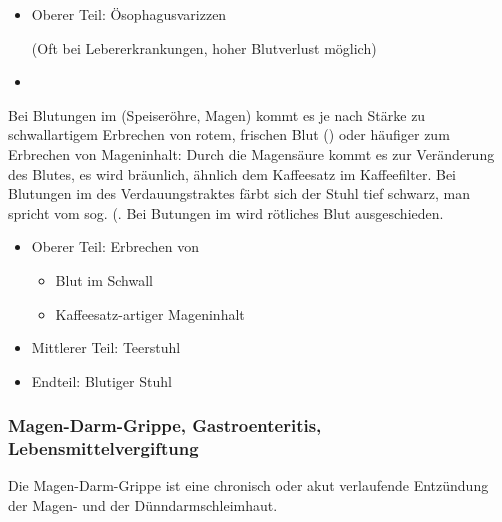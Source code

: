 {{}
{
\begin{itemize}
    \item Oberer Teil: Ösophagusvarizzen
    
    (Oft bei
    Lebererkrankungen, hoher Blutverlust möglich)
    \item {}
\end{itemize}
}{}{}{}

{
Bei Blutungen im 
(Speiseröhre, Magen) kommt es je nach Stärke zu
schwallartigem Erbrechen  von rotem, frischen Blut
() oder häufiger zum Erbrechen von
Mageninhalt: Durch die Magensäure kommt es zur Veränderung
des Blutes, es wird bräunlich, ähnlich dem Kaffeesatz im
Kaffeefilter. Bei Blutungen im  des
Verdauungstraktes färbt sich der Stuhl tief schwarz, man
spricht vom sog.  (. Bei Butungen im
 wird rötliches Blut ausgeschieden. 

}{
\begin{itemize}
  \item Oberer Teil: Erbrechen von
  \begin{itemize}
    \item Blut im Schwall
    \item Kaffeesatz-artiger Mageninhalt
  \end{itemize} 
  \item Mittlerer Teil: Teerstuhl
  \item Endteil: Blutiger Stuhl
\end{itemize}
}{}{}{}

\textleaf








\subsubsection{Magen-Darm-Grippe, Gastroenteritis,
Lebensmittelvergiftung}
\label{topic:gastroenteritis}
\label{topic:lebensmittelvergiftung}


Die Magen-Darm-Grippe ist eine chronisch oder akut
verlaufende Entzündung der Magen- und der Dünndarmschleimhaut. 

}
